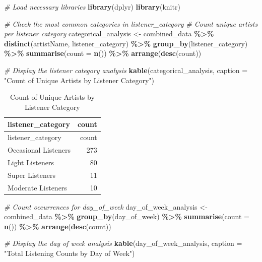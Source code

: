 \documentclass[
]{article}
\newenvironment{Shaded}{\begin{snugshade}}{\end{snugshade}}
\newcommand{\AttributeTok}[1]{\textcolor[rgb]{0.13,0.29,0.53}{#1}}
\newcommand{\CommentTok}[1]{\textcolor[rgb]{0.56,0.35,0.01}{\textit{#1}}}
\newcommand{\FunctionTok}[1]{\textcolor[rgb]{0.13,0.29,0.53}{\textbf{#1}}}
\newcommand{\NormalTok}[1]{#1}
\newcommand{\OtherTok}[1]{\textcolor[rgb]{0.56,0.35,0.01}{#1}}
\newcommand{\SpecialCharTok}[1]{\textcolor[rgb]{0.81,0.36,0.00}{\textbf{#1}}}
\newcommand{\StringTok}[1]{\textcolor[rgb]{0.31,0.60,0.02}{#1}}
\begin{document}
\begin{Shaded}
\begin{Highlighting}[]
\CommentTok{\# Load necessary libraries}
\FunctionTok{library}\NormalTok{(dplyr)}
\FunctionTok{library}\NormalTok{(knitr)}

\CommentTok{\# Check the most common categories in \textquotesingle{}listener\_category\textquotesingle{}}
\CommentTok{\# Count unique artists per listener category}
\NormalTok{categorical\_analysis }\OtherTok{\textless{}{-}}\NormalTok{ combined\_data }\SpecialCharTok{\%\textgreater{}\%}
  \FunctionTok{distinct}\NormalTok{(artistName, listener\_category) }\SpecialCharTok{\%\textgreater{}\%}
  \FunctionTok{group\_by}\NormalTok{(listener\_category) }\SpecialCharTok{\%\textgreater{}\%}
  \FunctionTok{summarise}\NormalTok{(}\AttributeTok{count =} \FunctionTok{n}\NormalTok{()) }\SpecialCharTok{\%\textgreater{}\%}
  \FunctionTok{arrange}\NormalTok{(}\FunctionTok{desc}\NormalTok{(count))}

\CommentTok{\# Display the listener category analysis}
\FunctionTok{kable}\NormalTok{(categorical\_analysis, }\AttributeTok{caption =} \StringTok{"Count of Unique Artists by Listener Category"}\NormalTok{)}
\end{Highlighting}
\end{Shaded}

\begin{longtable}[]{@{}lr@{}}
\caption{Count of Unique Artists by Listener Category}\tabularnewline
\toprule\noalign{}
listener\_category & count \\
\midrule\noalign{}
\endfirsthead
\toprule\noalign{}
listener\_category & count \\
\midrule\noalign{}
\endhead
\bottomrule\noalign{}
\endlastfoot
Occasional Listeners & 273 \\
Light Listeners & 80 \\
Super Listeners & 11 \\
Moderate Listeners & 10 \\
\end{longtable}

\begin{Shaded}
\begin{Highlighting}[]
\CommentTok{\# Count occurrences for day\_of\_week}
\NormalTok{day\_of\_week\_analysis }\OtherTok{\textless{}{-}}\NormalTok{ combined\_data }\SpecialCharTok{\%\textgreater{}\%}
  \FunctionTok{group\_by}\NormalTok{(day\_of\_week) }\SpecialCharTok{\%\textgreater{}\%}
  \FunctionTok{summarise}\NormalTok{(}\AttributeTok{count =} \FunctionTok{n}\NormalTok{()) }\SpecialCharTok{\%\textgreater{}\%}
  \FunctionTok{arrange}\NormalTok{(}\FunctionTok{desc}\NormalTok{(count))}

\CommentTok{\# Display the day of week analysis}
\FunctionTok{kable}\NormalTok{(day\_of\_week\_analysis, }\AttributeTok{caption =} \StringTok{"Total Listening Counts by Day of Week"}\NormalTok{)}
\end{Highlighting}
\end{Shaded}
\end{document}
